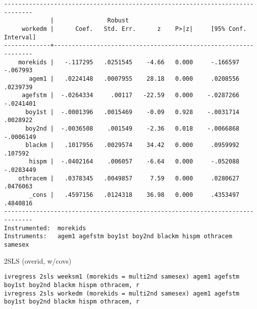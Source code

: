 \documentclass[11pt]{article}
\begin{document}
\begin{verbatim}
------------------------------------------------------------------------------
             |               Robust
     workedm |      Coef.   Std. Err.      z    P>|z|     [95% Conf. Interval]
-------------+----------------------------------------------------------------
    morekids |   -.117295   .0251545    -4.66   0.000     -.166597    -.067993
       agem1 |   .0224148   .0007955    28.18   0.000     .0208556    .0239739
     agefstm |  -.0264334     .00117   -22.59   0.000    -.0287266   -.0241401
      boy1st |  -.0001396   .0015469    -0.09   0.928    -.0031714    .0028922
      boy2nd |  -.0036508    .001549    -2.36   0.018    -.0066868   -.0006149
      blackm |   .1017956   .0029574    34.42   0.000     .0959992     .107592
       hispm |  -.0402164    .006057    -6.64   0.000     -.052088   -.0283449
    othracem |   .0378345   .0049857     7.59   0.000     .0280627    .0476063
       _cons |   .4597156   .0124318    36.98   0.000     .4353497    .4840816
------------------------------------------------------------------------------
Instrumented:  morekids
Instruments:   agem1 agefstm boy1st boy2nd blackm hispm othracem samesex
\end{verbatim}

2SLS (overid, w/covs)
\begin{verbatim}
ivregress 2sls weeksm1 (morekids = multi2nd samesex) agem1 agefstm boy1st boy2nd blackm hispm othracem, r
ivregress 2sls workedm (morekids = multi2nd samesex) agem1 agefstm boy1st boy2nd blackm hispm othracem, r
\end{verbatim}
\end{document}
